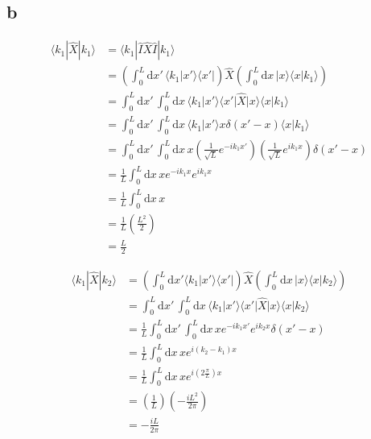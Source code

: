 \documentclass[letter]{article}
\begin{document}
\subsection*{b} 
\begin{align*}
	\langle k_1 | \hat{X} | k_1 \rangle  &= 
\langle k_1 | \hat{I} \hat{X} \hat{I}  | k_1 \rangle 
					  \\ &=
	\left(
\int_{0}^{L} \mathrm{d} x' \, \langle k_1 | x' \rangle \langle x' |  
	\right) \hat{X} 
	\left(
\int_{0}^{L}  \mathrm{d} x \, | x \rangle  \langle x | k_1 \rangle  
	\right)
	\\&= 
\int_{0}^{L} \mathrm{d} x'\,
\int_{0}^{L} \mathrm{d} x\, 
\langle k_1 | x' \rangle \langle x' | \hat{X} | x \rangle \langle x | k_1 \rangle 
	\\
	&= 
\int_{0}^{L} \mathrm{d} x'\,
\int_{0}^{L} \mathrm{d} x\, 
\langle k_1 | x' \rangle 
x \delta(x' - x)
\langle x | k_1 \rangle 
	\\
	&= 
\int_{0}^{L} \mathrm{d} x'\,
\int_{0}^{L} \mathrm{d} x\,  x 
\left(\frac{1}{\sqrt{L}  } e^{ - i k_1 x' }  \right) 
\left(\frac{1}{\sqrt{L}  } e^{  i k_1 x}  \right)  \delta(x' - x) \\
&= 
\frac{1}{L}\int_{0}^{L} \mathrm{d} x\,  x 
e^{-i k_1 x} e^{i k_1 x}
\\ 
&= 
\frac{1}{L} \int_{0}^{L} \mathrm{d} x \, x  
\\
&= 
\frac{1}{L} \left(\frac{L^2}{2}\right)
\\
&= \frac{L}{2} 
\end{align*}

\begin{align*}
	\langle k_1 | \hat{X} | k_2 \rangle &= 
	\left(
\int_{0}^{L} \mathrm{d} x'  \langle k_1 | x' \rangle \langle x' | 
	\right)
	\hat{X} 
	\left(
\int_{0}^{L}  \mathrm{d} x \, 
| x \rangle \langle x | k_2 \rangle 
	\right)
	\\
					    &= 
					    \int_{0}^{L} \mathrm{d} x'\,
\int_{0}^{L} \mathrm{d} x\, 
\langle k_1 | x' \rangle \langle x' | \hat{X} | x \rangle \langle x | k_2 \rangle 
	\\
	&= 
\frac{1}{L}
\int_{0}^{L} \mathrm{d} x' \, 
\int_{0}^{L}  \mathrm{d} x \, 
x e^{- i k_1 x' } e^{i k_2 x} \delta(x' - x)
	\\
	&= 
\frac{1}{L}
\int_{0}^{L} \mathrm{d} x \, 
x e^{i (k_2 - k_1) x} 
	\\
	&= 
\frac{1}{L}
\int_{0}^{L} \mathrm{d} x \, 
x e^{i \left(2 \frac{\pi}{L}\right) x} 
	\\ 
	&= 
	\left(\frac{1}{L} \right) \left(- \frac{i L^2}{2\pi}\right)
	\\
	&= 
- \frac{i L}{2 \pi }
	\\
\end{align*}
\end{document}
